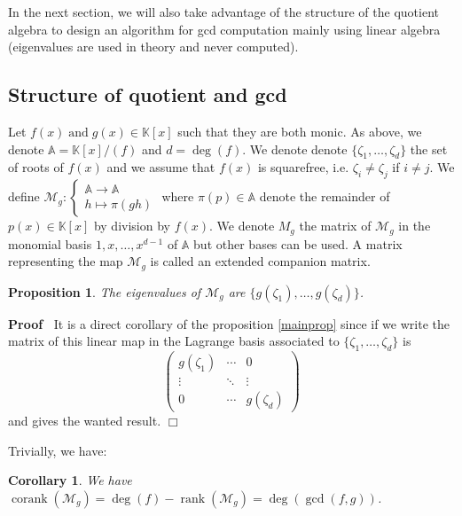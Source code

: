 \documentclass{article}
\newcommand{\tmop}[1]{\ensuremath{\operatorname{#1}}}
\newenvironment{proof}{\noindent\textbf{Proof\ }}{\hspace*{\fill}$\Box$\medskip}
\newtheorem{corollary}{Corollary}
\newtheorem{proposition}{Proposition}
\begin{document}
In the next section, we will also take advantage of the structure of the
quotient algebra to design an algorithm for gcd computation mainly using
linear algebra (eigenvalues are used in theory and never computed).

\subsection{Structure of quotient and gcd}



Let $f (x) \tmop{and} g (x) \in \mathbb{K}[x]$ such that they are both monic.
As above, we denote $\mathbb{A}=\mathbb{K}[x] / (f)$ and $d = \deg (f)$. We
denote denote $\{\zeta_1, \ldots, \zeta_d \}$ the set of roots of $f (x)$ and
we assume that $f (x)$ is squarefree, i.e. $\zeta_i \neq \zeta_j$ if $i \neq
j$. We define $\mathcal{M}_g : \left\{ \begin{array}{l}
  \mathbb{A} \longrightarrow \mathbb{A}\\
  h \longmapsto \pi (g h)
\end{array} \right.$ where $\pi (p) \in \mathbb{A}$ denote the remainder of
$p (x) \in \mathbb{K}[x]$ by division by $f (x)$. We denote $M_g$ the matrix
of $\mathcal{M}_g$ in the monomial basis $1, x, \ldots, x^{d - 1}$ of
$\mathbb{A}$ but other bases can be used. A matrix representing the map
$\mathcal{M}_g$ is called an extended companion matrix.

\begin{proposition}
  The eigenvalues of $\mathcal{M}_g$ are $\{g (\zeta_1), \ldots, g
  (\zeta_d)\}$.
\end{proposition}

\begin{proof}
  It is a direct corollary of the proposition \ref{mainprop} since if we write
  the matrix of this linear map in the Lagrange basis associated to
  $\{\zeta_1, \ldots, \zeta_d \}$ is
  \[ \left(\begin{array}{ccc}
       g (\zeta_1) & \cdots & 0\\
       \vdots & \ddots & \vdots\\
       0 & \cdots & g (\zeta_d)
     \end{array}\right) \]
  and gives the wanted result.
\end{proof}

Trivially, we have:

\begin{corollary}
  We have $\tmop{corank} (\mathcal{M}_g) = \deg (f) - \tmop{rank}
  (\mathcal{M}_g) = \deg (\gcd (f, g))$.
\end{corollary}
\end{document}
